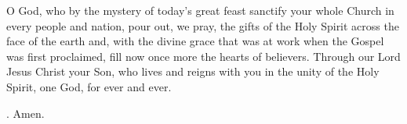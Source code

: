 \lettrine[lines=3]{O}{} God, who by the mystery of today’s great feast
sanctify your whole Church in every people and nation,
pour out, we pray, the gifts of the Holy Spirit
across the face of the earth
and, with the divine grace that was at work
when the Gospel was first proclaimed,
fill now once more the hearts of believers.
Through our Lord Jesus Christ your Son,
who lives and reigns with you in the unity of the Holy Spirit,
one God, for ever and ever.
\par \Rbar. Amen.
